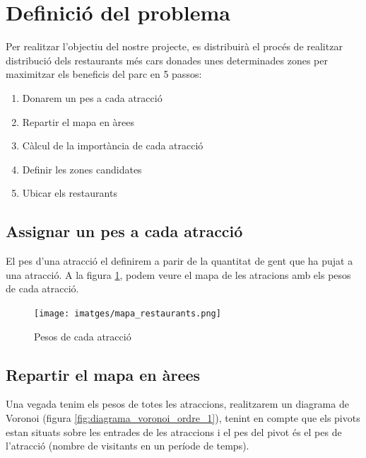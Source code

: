 \documentclass[12pt]{article}
\begin{document}
\clearpage
\section{Definició del problema}
Per realitzar l'objectiu del nostre projecte, es distribuirà el procés de realitzar distribució dels restaurants més cars donades unes determinades zones per maximitzar els beneficis del parc en 5 passos:
\begin{enumerate}
	\item Donarem un pes a cada atracció
	\item Repartir el mapa en àrees
	\item Càlcul de la importància de cada atracció
	\item Definir les zones candidates
	\item Ubicar els restaurants
\end{enumerate}

\subsection{Assignar un pes a cada atracció}
El pes d'una atracció el definirem a parir de la quantitat de gent que ha pujat a una atracció. A la figura \ref{fig:mapa_areas}, podem veure el mapa de les atracions amb els pesos de cada atracció.

\begin{figure}[H]
	\centering
	\texttt{[image: imatges/mapa\_restaurants.png]}\par\vspace{1cm}
	\caption{Pesos de cada atracció}
	\label{fig:mapa_areas}
\end{figure}

\subsection{Repartir el mapa en àrees}
Una vegada tenim els pesos de totes les atraccions, realitzarem un diagrama de Voronoi (figura \ref{fig:diagrama_voronoi_ordre_1}), tenint en compte que els pivots estan situats sobre les entrades de les atraccions i el pes del pivot és el pes de l’atracció (nombre de visitants en un període de temps).
		
\end{document}
